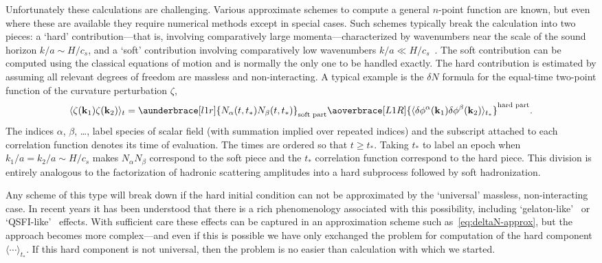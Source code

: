 \documentclass[11pt,a4paper]{article}
\newcommand{\vect}[1]{\bm{\mathrm{{#1}}}}
\renewcommand{\geq}{\geqslant}
\begin{document}
Unfortunately these calculations are challenging.
Various
approximate schemes to compute a general $n$-point function are known,
but even where these are available they require numerical methods
except in special cases.
Such schemes typically break the calculation into two pieces:
a `hard' contribution---that is, involving comparatively
large momenta---characterized by wavenumbers near the scale
of the sound horizon $k/a \sim H / c_s$,
and a `soft' contribution involving comparatively low wavenumbers
$k/a \ll H / c_s$~\cite{Dias:2012qy}.
The soft contribution can be computed using the classical
equations of motion and is normally the only one to be handled exactly.
The hard contribution is estimated by assuming
all relevant degrees of freedom are massless and non-interacting.
A typical example is the $\delta N$ formula for the
equal-time two-point function
of the curvature perturbation $\zeta$,
\begin{equation}
    \langle \zeta(\vect{k}_1) \zeta(\vect{k}_2) \rangle_t
    = \aunderbrace[l1r]{N_\alpha(t, t_\ast) N_\beta(t, t_\ast)}_{\text{soft part}}
    \aoverbrace[L1R]{\langle \delta\phi^\alpha(\vect{k}_1) \delta\phi^\beta(\vect{k}_2) \rangle_{t_\ast}}^{\text{hard part}} .
    \label{eq:deltaN-approx}
\end{equation}
The indices $\alpha$, $\beta$, \ldots, label species of scalar
field (with summation implied over repeated indices)
and the subscript attached to each correlation function
denotes its time of evaluation.
The times are ordered so that $t \geq t_\ast$.
Taking $t_\ast$ to label an epoch when
$k_1 / a = k_2 / a \sim H / c_s$
makes $N_\alpha N_\beta$
correspond to the soft piece
and the $t_\ast$ correlation function
correspond to the hard piece.
This division is entirely analogous to the factorization
of hadronic scattering amplitudes into a hard subprocess
followed by soft hadronization.

Any scheme of this type will break down if the
hard initial condition
can not be approximated by the `universal'
massless, non-interacting case.
In recent years it has been understood that there is
a rich phenomenology associated with this possibility,
including `gelaton-like'~\cite{Tolley:2009fg}
or
`QSFI-like'~\cite{Chen:2009we,Chen:2009zp,Chen:2012ge}
effects.
With sufficient care these effects can be captured
in an approximation scheme such as~\eqref{eq:deltaN-approx},
but the approach becomes more complex---and
even if this is possible we have only exchanged the problem
for computation of the hard
component
$\langle \cdots \rangle_{t_\ast}$.
If this hard component is not universal,
then the problem
is no easier than
calculation with which we started.
\end{document}

